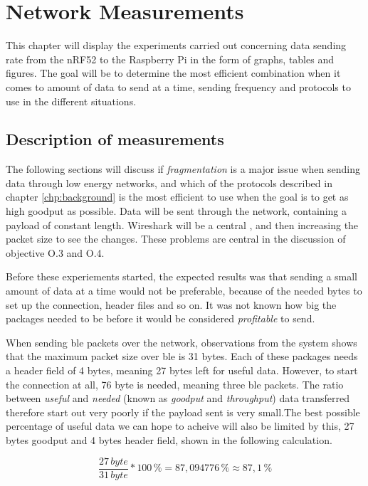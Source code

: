 \chapter{Network Measurements}
\label{chp:measurements2}


This chapter will display the experiments carried out concerning data sending rate from the \gls{nRF52} to the \gls{Raspberry Pi} in the form of graphs, tables and figures. The goal will be to determine the most efficient combination when it comes to amount of data to send at a time, sending frequency and protocols to use in the different situations. 

\section{Description of measurements}

The following sections will discuss if \textit{fragmentation} is a major issue when sending data through low energy networks, and which of the protocols described in chapter \ref{chp:background}  is the most efficient to use when the goal is to get as high \gls{goodput} as possible. Data will be sent through the network, containing a payload of constant length. Wireshark will be a central , and then increasing the packet size to see the changes. These problems are central in the discussion of objective O.3 and O.4. 

\noindent Before these experiements started, the expected results was that sending a small amount of data at a time would not be preferable, because of the needed bytes to set up the connection, header files and so on. It was not known how big the packages needed to be before it would be considered \textit{profitable} to send. 

\noindent When sending \gls{ble} packets over the network, observations from the system shows that the maximum packet size over \gls{ble} is 31 bytes. Each of these packages needs a header field of 4 bytes, meaning 27 bytes left for useful data. However, to start the connection at all, 76 byte is needed, meaning three \gls{ble} packets. The ratio between \textit{useful} and \textit{needed} (known as \textit{goodput} and \textit{throughput}) data transferred therefore start out very poorly if the payload sent is very small.The best possible percentage of useful data we can hope to acheive will also be limited by this, 27 bytes goodput and 4 bytes header field, shown in the following calculation.  

\begin{equation}
    \frac{27 \, byte}{31 \, byte}*100 \,\% = 87,094776 \,\% \approx 87,1 \,\%
\end{equation}


